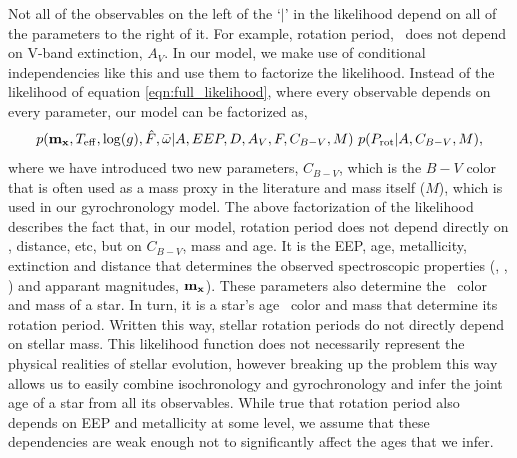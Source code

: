Not all of the observables on the left of the `$|$' in the likelihood depend
on all of the parameters to the right of it.
For example, rotation period, \prot\ does not depend on V-band extinction,
$A_V$.
In our model, we make use of conditional independencies like this and use them
to factorize the likelihood.
Instead of the likelihood of equation \ref{eqn:full_likelihood},
where every observable depends on every parameter, our model can be factorized
as,
\begin{equation} \label{eqn:factorized}
    p({\bf m_x}, T_{\mathrm{eff}}, \log(g), \hat{F}, \bar{\omega}
    |A, EEP, D, A_V, F, C_{B-V}, M) ~p(P_\mathrm{rot}|A, C_{B-V}, M),
\end{equation}
where we have introduced two new parameters, $C_{B-V}$, which is the $B-V$
color that is often used as a mass proxy in the literature and mass itself
($M$), which is used in our gyrochronology model.
The above factorization of the likelihood describes the fact that, in our
model, rotation period does not depend directly on \teff, distance, etc, but
on $C_{B-V}$, mass and age.
It is the EEP, age, metallicity, extinction and distance that determines the
observed spectroscopic properties (\teff, \logg, \feh) and apparant
magnitudes, ${\bf m_x}$).
These parameters also determine the \cbv\ color and mass of a star.
In turn, it is a star's age \cbv\ color and mass that determine its rotation
period.
Written this way, stellar rotation periods do not directly depend
on stellar mass.
This likelihood function does not necessarily represent the physical realities
of stellar evolution, however breaking up the problem this way allows us to
easily combine isochronology and gyrochronology and infer the joint age of a
star from all its observables.
While true that rotation period also depends on EEP and metallicity at some
level, we assume that these dependencies are weak enough not to significantly
affect the ages that we infer.

